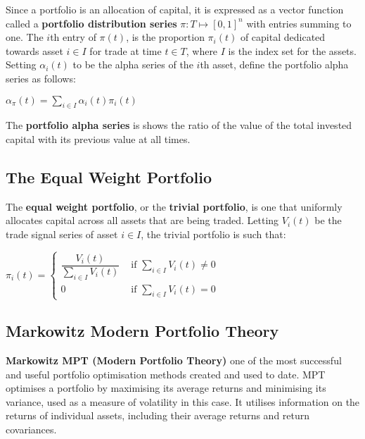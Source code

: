 \documentclass[11pt]{article}
\begin{document}
Since a portfolio is an allocation of capital, it is expressed as a vector function called a \textbf{portfolio distribution series} $\pi:T \mapsto [0,1]^{n}$ with entries summing to one. The $i$th entry of $\pi(t)$, is the proportion $\pi_{i}(t)$ of capital dedicated towards asset $i \in I$ for trade at time $t \in T$, where $I$ is the index set for the assets.\\

Setting $\alpha_{i}(t)$ to be the alpha series of the $i$th asset, define the portfolio alpha series as follows:
\begin{center}
    $\alpha_{\pi}(t)=\sum_{i \in I}\alpha_{i}(t)\pi_{i}(t)$
\end{center}

The \textbf{portfolio alpha series} is shows the ratio of the value of the total invested capital with its previous value at all times.

\subsection{The Equal Weight Portfolio}

The \textbf{equal weight portfolio}, or the \textbf{trivial portfolio}, is one that uniformly allocates capital across all assets that are being traded. Letting $V_i(t)$ be the trade signal series of asset $i \in I$, the trivial portfolio is such that:
\begin{center}
    $\pi_i(t) = \begin{cases}
    \dfrac{V_i(t)}{\sum_{i \in I}V_i(t)} & \text{ if } \sum_{i \in I}V_i(t) \neq 0 \\
    0 & \text{ if } \sum_{i \in I}V_i(t) = 0
    \end{cases}$
\end{center}

\subsection{Markowitz Modern Portfolio Theory}

\textbf{Markowitz MPT (Modern Portfolio Theory)} one of the most successful and useful portfolio optimisation methods created and used to date. MPT optimises a portfolio by maximising its average returns and minimising its variance, used as a measure of volatility in this case. It utilises information on the returns of individual assets, including their average returns and return covariances.\\
\end{document}
